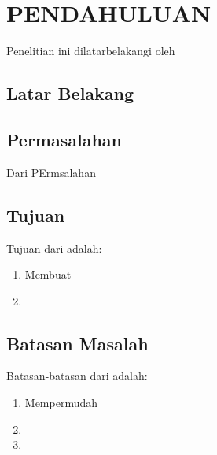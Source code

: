 \chapter{PENDAHULUAN}
\label{chap:pendahuluan}


Penelitian ini dilatarbelakangi oleh \lipsum[1][1-5]

\section{Latar Belakang}
\label{sec:latarbelakang}

 \lipsum[1]

\lipsum[2]

\section{Permasalahan}
\label{sec:permasalahan}

Dari PErmsalahan \lipsum[1][1-6]

\section{Tujuan}
\label{sec:Tujuan}

Tujuan dari \lipsum[1][1-3] adalah:

\begin{enumerate}[nolistsep]

  \item Membuat \lipsum[2][1-3]

  \item \lipsum[3][1-3]

\end{enumerate}

\section{Batasan Masalah}
\label{sec:batasanmasalah}

Batasan-batasan dari \lipsum[1][1-3] adalah:

\begin{enumerate}[nolistsep]

  \item Mempermudah \lipsum[2][1-3]

  \item \lipsum[3][1-5]

  \item \lipsum[4][1-5]

\end{enumerate}

